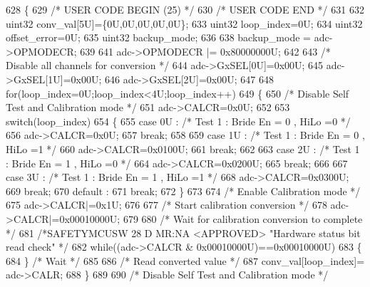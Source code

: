 \begin{DoxyCode}
628 \{
629 \textcolor{comment}{/* USER CODE BEGIN (25) */}
630 \textcolor{comment}{/* USER CODE END */}
631     
632     uint32 conv\_val[5U]=\{0U,0U,0U,0U,0U\};
633     uint32 loop\_index=0U;
634     uint32 offset\_error=0U;
635     uint32 backup\_mode;
636     
638     backup\_mode = adc->OPMODECR;
639     
641     adc->OPMODECR |= 0x80000000U;
642 
643     \textcolor{comment}{/* Disable all channels for conversion */}
644     adc->GxSEL[0U]=0x00U;
645     adc->GxSEL[1U]=0x00U;
646     adc->GxSEL[2U]=0x00U;
647 
648     \textcolor{keywordflow}{for}(loop\_index=0U;loop\_index<4U;loop\_index++)
649     \{
650         \textcolor{comment}{/* Disable Self Test and Calibration mode */}
651         adc->CALCR=0x0U;
652     
653         \textcolor{keywordflow}{switch}(loop\_index)
654         \{
655             \textcolor{keywordflow}{case} 0U :   \textcolor{comment}{/* Test 1 : Bride En = 0 , HiLo =0 */}
656                         adc->CALCR=0x0U;
657                         \textcolor{keywordflow}{break};
658 
659             \textcolor{keywordflow}{case} 1U :   \textcolor{comment}{/* Test 1 : Bride En = 0 , HiLo =1 */}
660                         adc->CALCR=0x0100U;
661                         \textcolor{keywordflow}{break};
662 
663             \textcolor{keywordflow}{case} 2U :   \textcolor{comment}{/* Test 1 : Bride En = 1 , HiLo =0 */}
664                         adc->CALCR=0x0200U;
665                         \textcolor{keywordflow}{break};
666         
667             \textcolor{keywordflow}{case} 3U :   \textcolor{comment}{/* Test 1 : Bride En = 1 , HiLo =1 */}
668                         adc->CALCR=0x0300U;
669                         \textcolor{keywordflow}{break};
670             default :
671                         \textcolor{keywordflow}{break};
672         \}
673     
674         \textcolor{comment}{/* Enable Calibration mode */}
675         adc->CALCR|=0x1U;
676     
677         \textcolor{comment}{/* Start calibration conversion */}
678         adc->CALCR|=0x00010000U;
679 
680         \textcolor{comment}{/* Wait for calibration conversion to complete */}
681         \textcolor{comment}{/*SAFETYMCUSW 28 D MR:NA <APPROVED> "Hardware status bit read check" */}
682         \textcolor{keywordflow}{while}((adc->CALCR & 0x00010000U)==0x00010000U)
683         \{ 
684         \} \textcolor{comment}{/* Wait */}
685 
686         \textcolor{comment}{/* Read converted value */}
687         conv\_val[loop\_index]= adc->CALR;
688     \}
689 
690     \textcolor{comment}{/* Disable Self Test and Calibration mode */}

\end{DoxyCode}
